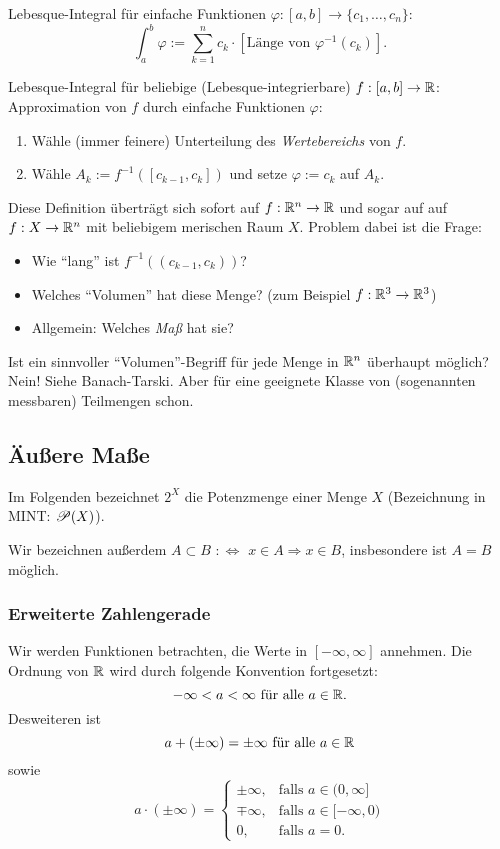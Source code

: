 \documentclass[
 a4paper,
 12pt,
 parskip=half
 ]{scrartcl}
\theoremstyle{plain}
\theoremstyle{definition}
\numberwithin{equation}{section}
\begin{document}
Lebesque-Integral für einfache Funktionen $\varphi:[a,b] \to \{ c_1, \ldots, c_n \}$:
\[ \int_a^b \varphi := \sum_{k=1}^n c_k \cdot [ \text{Länge von } \varphi^{-1}(c_k) ]. \]

Lebesque-Integral für beliebige (Lebesque-integrierbare) $f:[a,b]\to\mathbb{R}$: Approximation von $f$ durch einfache Funktionen $\varphi$:
\begin{enumerate}
 \item Wähle (immer feinere) Unterteilung des \emph{Wertebereichs} von $f$.
 \item Wähle $A_k := f^{-1}([c_{k-1},c_k])$ und setze $\varphi := c_k$ auf $A_k$.
\end{enumerate}

Diese Definition überträgt sich sofort auf $f: \mathbb{R}^n \to \mathbb{R}$ und sogar auf auf $f: X \to \mathbb{R}^n$ mit beliebigem merischen Raum $X$. Problem dabei ist die Frage: 
\begin{itemize}
 \item Wie ``lang'' ist $f^{-1}((c_{k-1},c_k))$?
 \item Welches ``Volumen'' hat diese Menge? (zum Beispiel $f: \mathbb{R}^3 \to \mathbb{R}^3$)
 \item Allgemein: Welches \emph{Maß} hat sie?
\end{itemize}
Ist ein sinnvoller ``Volumen''-Begriff für jede Menge in $\mathbb{R}^n$ überhaupt möglich? Nein! Siehe Banach-Tarski. Aber für eine geeignete Klasse von (sogenannten messbaren) Teilmengen schon.

\subsection{Äußere Maße}
Im Folgenden bezeichnet $2^X$ die Potenzmenge einer Menge $X$ (Bezeichnung in MINT: $\mathscr{P}(X)$).

Wir bezeichnen außerdem $A \subset B$ $:\Leftrightarrow$ $x \in A \Rightarrow x \in B$, insbesondere ist $A = B$ möglich.

\subsubsection{Erweiterte Zahlengerade}
Wir werden Funktionen betrachten, die Werte in $[-\infty, \infty]$ annehmen. Die Ordnung von $\mathbb{R}$ wird durch folgende Konvention fortgesetzt:
\[ - \infty < a < \infty \text{ für alle } a \in \mathbb{R}. \]
Desweiteren ist 
\[ a + (\pm \infty) = \pm \infty \text{ für alle } a \in \mathbb{R} \]
sowie 
\[ a \cdot (\pm \infty) = \begin{cases}
                           \pm \infty, &\text{falls } a \in (0, \infty] \\
                           \mp \infty, &\text{falls } a \in [-\infty, 0) \\
                           0, &\text{falls } a = 0.
                          \end{cases} \]
\end{document}
